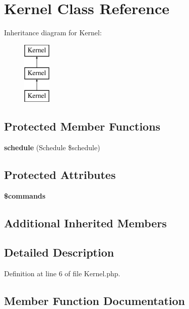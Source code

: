 \section{Kernel Class Reference}
\label{class_app_1_1_console_1_1_kernel}
Inheritance diagram for Kernel\+:\begin{figure}[H]
\begin{center}
\leavevmode
\includegraphics[height=3.000000cm]{class_app_1_1_console_1_1_kernel}
\end{center}
\end{figure}
\subsection*{Protected Member Functions}
\begin{DoxyCompactItemize}
\item 
{\bf schedule} (Schedule \$schedule)
\end{DoxyCompactItemize}
\subsection*{Protected Attributes}
\begin{DoxyCompactItemize}
\item 
{\bf \$commands}
\end{DoxyCompactItemize}
\subsection*{Additional Inherited Members}


\subsection{Detailed Description}


Definition at line 6 of file Kernel.\+php.



\subsection{Member Function Documentation}
